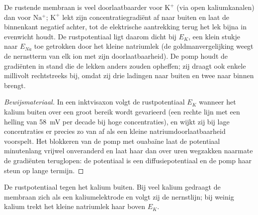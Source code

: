 \begin{proposition}\label{prop:b1:membranes-transport:resting}
De rustende membraan is veel doorlaatbaarder voor $\mathrm{K^+}$ (via open
kaliumkanalen) dan voor $\mathrm{Na^+}$; $\mathrm{K^+}$ lekt zijn
concentratiegradiënt af naar buiten en laat de binnenkant negatief achter, tot de
elektrische aantrekking terug het lek bijna in evenwicht houdt. De rustpotentiaal
ligt daarom dicht bij $E_K$, een klein stukje naar $E_{Na}$ toe getrokken door het
kleine natriumlek (de goldmanvergelijking weegt de nernstterm van elk ion met zijn
doorlaatbaarheid). De pomp houdt de gradiënten in stand die de lekken anders
zouden opheffen; zij draagt ook enkele millivolt rechtstreeks bij, omdat zij drie
ladingen naar buiten en twee naar binnen brengt.
\end{proposition}
\begin{proof}[Bewijsmateriaal]
In een inktvisaxon volgt de rustpotentiaal $E_K$ wanneer het kalium buiten over
een groot bereik wordt gevarieerd (een rechte lijn met een helling van
\qty{58}{mV} per decade bij hoge concentraties), en wijkt zij bij lage
concentraties er precies zo van af als een kleine natriumdoorlaatbaarheid
voorspelt. Het blokkeren van de pomp met ouabaïne laat de potentiaal minutenlang
vrijwel onveranderd en laat haar dan over uren wegzakken naarmate de gradiënten
teruglopen: de potentiaal is een diffusiepotentiaal en de pomp haar steun op
lange termijn.
\end{proof}

\begin{omfigure}

{\small De rustpotentiaal tegen het kalium buiten. Bij veel kalium gedraagt de
membraan zich als een kaliumelektrode en volgt zij de nernstlijn; bij weinig
kalium trekt het kleine natriumlek haar boven $E_K$.}
\end{omfigure}

